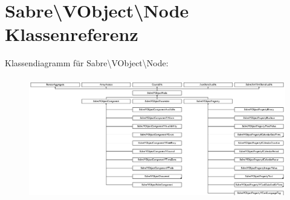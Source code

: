 \hypertarget{class_sabre_1_1_v_object_1_1_node}{}\section{Sabre\textbackslash{}V\+Object\textbackslash{}Node Klassenreferenz}
\label{class_sabre_1_1_v_object_1_1_node}
Klassendiagramm für Sabre\textbackslash{}V\+Object\textbackslash{}Node\+:\begin{figure}[H]
\begin{center}
\leavevmode
\includegraphics[height=5.369863cm]{class_sabre_1_1_v_object_1_1_node}
\end{center}
\end{figure}
